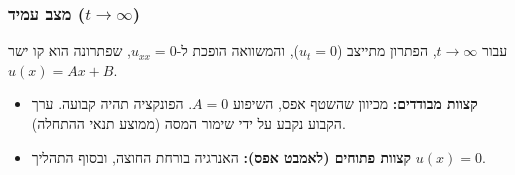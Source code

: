 \subsubsection{מצב עמיד ($t \to \infty$)}
עבור $t \to \infty$, הפתרון מתייצב ($u_t = 0$), והמשוואה הופכת ל-$u_{xx} = 0$, שפתרונה הוא קו ישר $u(x) = Ax + B$.
\begin{itemize}
    \item \textbf{קצוות מבודדים:} מכיוון שהשטף אפס, השיפוע $A=0$. הפונקציה תהיה קבועה. ערך הקבוע נקבע על ידי שימור המסה (ממוצע תנאי ההתחלה).
    \item \textbf{קצוות פתוחים (לאמבט אפס):} האנרגיה בורחת החוצה, ובסוף התהליך $u(x) = 0$.
\end{itemize}

